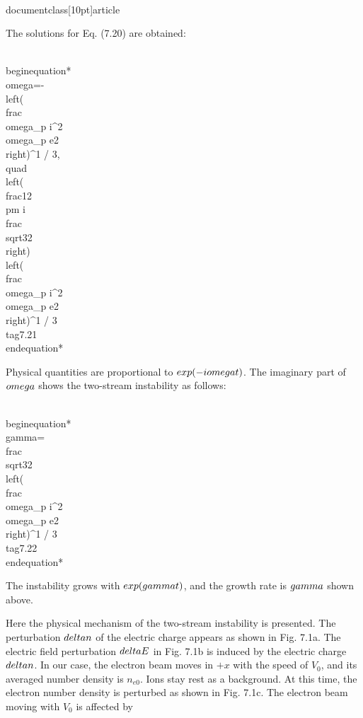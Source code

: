 \\documentclass[10pt]{article}
\begin{document}
{{{{The solutions for Eq. (7.20) are obtained:


\\begin{equation*}
\\omega=-\\left(\\frac{\\omega_{p i}^{2} \\omega_{p e}}{2}\\right)^{1 / 3}, \\quad\\left(\\frac{1}{2} \\pm i \\frac{\\sqrt{3}}{2}\\right)\\left(\\frac{\\omega_{p i}^{2} \\omega_{p e}}{2}\\right)^{1 / 3} \\tag{7.21}
\\end{equation*}


Physical quantities are proportional to $\\exp (-i \\omega t)$. The imaginary part of $\\omega$ shows the two-stream instability as follows:


\\begin{equation*}
\\gamma=\\frac{\\sqrt{3}}{2}\\left(\\frac{\\omega_{p i}^{2} \\omega_{p e}}{2}\\right)^{1 / 3} \\tag{7.22}
\\end{equation*}


The instability grows with $\\exp (\\gamma t)$, and the growth rate is $\\gamma$ shown above.

Here the physical mechanism of the two-stream instability is presented. The perturbation $\\delta n$ of the electric charge appears as shown in Fig. 7.1a. The electric field perturbation $\\delta E$ in Fig. 7.1b is induced by the electric charge $\\delta n$. In our case, the electron beam moves in $+x$ with the speed of $V_{0}$, and its averaged number density is $n_{e 0}$. Ions stay rest as a background. At this time, the electron number density is perturbed as shown in Fig. 7.1c. The electron beam moving with $V_{0}$ is affected by

}}}}
\end{document}
